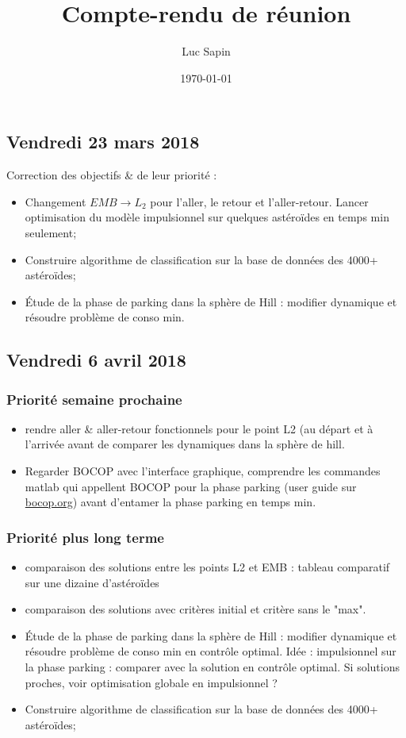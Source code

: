 \documentclass[fleqn,%
a4paper,11pt]{scrbook}
\title{Compte-rendu de réunion}
\author{Luc Sapin}
\date{\today}
\begin{document}
\maketitle
\chapter*{}
\label{cha:cr-reu}
\section*{Vendredi 23 mars 2018}
Correction des objectifs \& de leur priorité :
\begin{itemize}
	\item Changement $EMB \rightarrow L_2$ pour l'aller, le retour et l'aller-retour. Lancer optimisation du modèle impulsionnel sur quelques astéroïdes en temps min seulement;
	\item Construire algorithme de classification sur la base de données des 4000+ astéroïdes;
	\item Étude de la phase de parking dans la sphère de Hill : modifier dynamique et résoudre problème de conso min. 
\end{itemize} 

\section*{Vendredi 6 avril 2018}
\subsection*{Priorité semaine prochaine}
\begin{itemize}
	\item rendre aller \& aller-retour fonctionnels pour le point L2 (au départ et à l'arrivée avant de comparer les dynamiques dans la sphère de hill.
	\item Regarder BOCOP avec l'interface graphique, comprendre les commandes matlab qui appellent BOCOP pour la phase parking (user guide sur \href{bocop.org}{bocop.org}) avant d’entamer la phase parking en temps min.
\end{itemize}

\subsection*{Priorité plus long terme}
\begin{itemize}
	\item comparaison des solutions entre les points L2 et EMB : tableau comparatif sur une dizaine d'astéroïdes
	\item comparaison des solutions avec critères initial et critère sans le "max".
	\item Étude de la phase de parking dans la sphère de Hill : modifier dynamique et résoudre problème de conso min en contrôle optimal.
	Idée : impulsionnel sur la phase parking : comparer avec la solution en contrôle optimal. Si solutions proches, voir optimisation globale en impulsionnel ?
	\item Construire algorithme de classification sur la base de données des 4000+ astéroïdes; 
\end{itemize}
\end{document}

